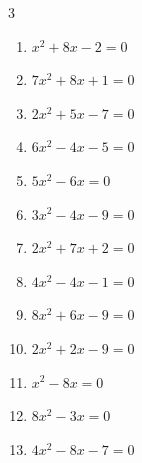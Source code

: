 \begin{multicols}{3}
\begin{enumerate}
  \item $x^{2}+8x-2=0$


  \item $7x^{2}+8x+1=0$


\columnbreak %

  \item $2x^{2}+5x-7=0$


  \item $6x^{2}-4x-5=0$


  \item $5x^{2}-6x=0$


  \item $3x^{2}-4x-9=0$


  \item $2x^{2}+7x+2=0$


  \item $4x^{2}-4x-1=0$


  \item $8x^{2}+6x-9=0$


\columnbreak %

  \item $2x^{2}+2x-9=0$


  \item $x^{2}-8x=0$

        \phantom{$\displaystyle x=8, \; 0$}

  \item $8x^{2}-3x=0$


  \item $4x^{2}-8x-7=0$


\end{enumerate}
\end{multicols}
